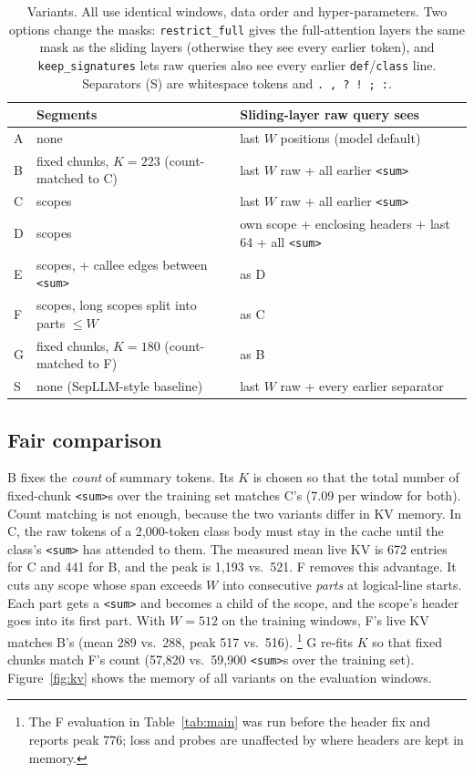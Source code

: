 \documentclass[11pt]{article}
\newcommand{\sumtok}{\texttt{<sum>}}
\begin{document}
\begin{table}[t]
\centering\small
\begin{tabular}{@{}lll@{}}
\toprule
& Segments & Sliding-layer raw query sees \\
\midrule
A & none & last $W$ positions (model default) \\
B & fixed chunks, $K=223$ (count-matched to C) & last $W$ raw + all earlier \sumtok{} \\
C & scopes & last $W$ raw + all earlier \sumtok{} \\
D & scopes & own scope + enclosing headers + last 64 + all \sumtok{} \\
E & scopes, + callee edges between \sumtok{} & as D \\
F & scopes, long scopes split into parts $\le W$ & as C \\
G & fixed chunks, $K=180$ (count-matched to F) & as B \\
S & none (SepLLM-style baseline) & last $W$ raw + every earlier separator \\
\bottomrule
\end{tabular}
\caption{Variants. All use identical windows, data order and hyper-parameters.
Two options change the masks: \texttt{restrict\_full} gives the
full-attention layers the same mask as the sliding layers (otherwise they
see every earlier token), and \texttt{keep\_signatures} lets raw queries also
see every earlier \texttt{def}/\texttt{class} line. Separators (S) are
whitespace tokens and \texttt{.}~\texttt{,}~\texttt{?}~\texttt{!}~\texttt{;}~\texttt{:}.}
\label{tab:variants}
\end{table}

\subsection{Fair comparison}\label{sec:fair}

B fixes the \emph{count} of summary tokens. Its $K$ is chosen so that the
total number of fixed-chunk \sumtok{}s over the training set matches C's
(7.09 per window for both). Count matching is not enough,
because the two variants differ in KV memory. In C, the raw tokens of a
2{,}000-token class body must stay in the cache until the class's \sumtok{}
has attended to them. The measured mean live KV is 672 entries for C and 441
for B, and the peak is 1{,}193 vs.\ 521. F removes this advantage. It cuts any
scope whose span exceeds $W$ into consecutive \emph{parts} at logical-line
starts. Each part gets a \sumtok{} and becomes a child of the scope, and the
scope's header goes into its first part. With $W=512$ on the training
windows, F's live KV matches B's (mean 289 vs.\ 288, peak 517 vs.\ 516).%
\footnote{The F evaluation in Table~\ref{tab:main} was run before the header
fix and reports peak 776; loss and probes are unaffected by where headers are
kept in memory.}
G re-fits $K$ so that fixed chunks match F's count (57{,}820 vs.\ 59{,}900
\sumtok{}s over the training set). Figure~\ref{fig:kv} shows the memory of
all variants on the evaluation windows.
\end{document}
